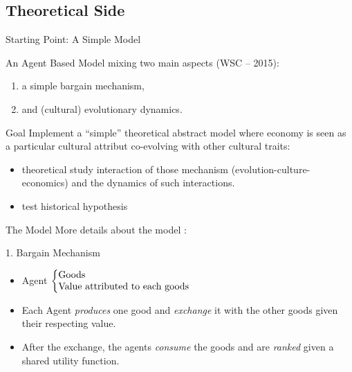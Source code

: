 \documentclass[8pt, handout=show,notes=show]{beamer}
\begin{document}
\subsection*{Theoretical Side}
\begin{frame}{Starting Point: A Simple Model}

	An Agent Based Model mixing two main aspects (WSC -- 2015):

	\vfil
	\begin{enumerate}
		\item a	simple bargain mechanism,
		\item and (cultural) evolutionary dynamics.
	\end{enumerate}

	\vfill
	\begin{alertblock}{Goal}
	    Implement a ``simple'' theoretical abstract model where economy is seen as a particular cultural attribut co-evolving with other cultural traits:
	    \begin{itemize}
		\item theoretical study interaction of those mechanism (evolution-culture-economics) and the dynamics of such interactions.
		\item test historical hypothesis
	    \end{itemize}
	\end{alertblock}

\end{frame}



	
\begin{frame}{The Model}
    More details about the model : 
    \vfill
	\begin{block}{1. Bargain Mechanism}
	    \begin{itemize}
		\item Agent 
		    $\left\{
			\begin{tabular}{@{}l@{}}
			    Goods \\
			    Value attributed to each goods\\
			\end{tabular}
			\right.$
		    \item Each Agent \emph{produces} one good and \emph{exchange} it with the other goods given their respecting value.
		    \item After the exchange, the agents \emph{consume} the goods and are \emph{ranked} given a shared utility function.
		\end{itemize}

	\end{block}
\end{frame}
\end{document}
